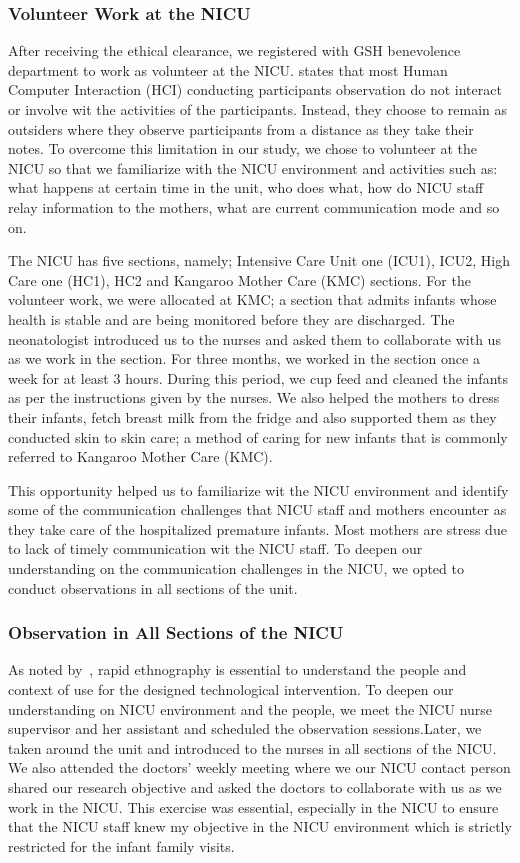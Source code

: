 \subsubsection{Volunteer Work at the NICU}
After receiving the ethical clearance, we registered with GSH benevolence department to work as volunteer at the NICU. \textcite{Ross2014} states that most Human Computer Interaction (HCI) conducting participants observation do not interact or involve wit the activities of the participants. Instead, they choose to remain as outsiders where they observe participants from a distance as they take their notes. To overcome this limitation in our study, we chose to volunteer at the NICU so that we familiarize with the NICU environment and activities such as: what happens at certain time in the unit, who does what, how do NICU staff relay information to the mothers, what are current communication mode and so on.

The NICU has five sections, namely; Intensive Care Unit one (ICU1), ICU2, High Care one (HC1), HC2 and Kangaroo Mother Care (KMC) sections. For the volunteer work, we were allocated at KMC; a section that admits infants whose health is stable and are being monitored before they are discharged. The neonatologist introduced us to the nurses and asked them to collaborate with us as we work in the section. For three months, we worked in the section once a week for at least 3 hours. During this period, we cup feed and cleaned the infants as per the instructions given by the nurses. We also helped the mothers to dress their infants, fetch breast milk from the fridge and also supported them as they conducted skin to skin care; a method of caring for new infants that is commonly referred to Kangaroo Mother Care (KMC). 

This opportunity helped us to familiarize wit the NICU environment and identify some of the communication challenges that NICU staff and mothers encounter as they take care of the hospitalized premature infants. Most mothers are stress due to lack of timely communication wit the NICU staff. To deepen our understanding on the communication challenges in the NICU, we opted to conduct observations in all sections of the unit.

 \subsubsection{Observation in All Sections of the NICU}
As  noted  by~\textcite{Millen2000f},  rapid ethnography  is  essential to  understand  the  people and context of use for the designed technological intervention. To deepen our understanding on NICU environment and the people, we  meet the NICU nurse supervisor and her assistant and scheduled the observation sessions.Later, we taken around the unit and introduced to the nurses in all sections of the NICU. We also attended the doctors' weekly meeting where we our NICU contact person shared our research objective and asked the doctors to collaborate with us as we work in the NICU. This exercise was essential, especially in the NICU to ensure that the NICU staff knew my objective in the NICU environment which is strictly  restricted for the infant family visits.

